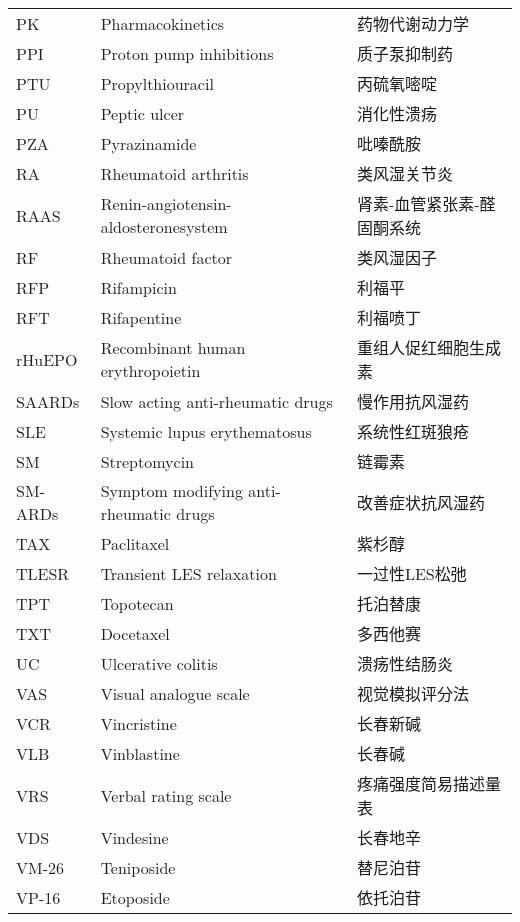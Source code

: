 \begin{longtable}[]{@{}lll@{}}
PK & Pharmacokinetics & 药物代谢动力学\tabularnewline
PPI & Proton pump inhibitions & 质子泵抑制药\tabularnewline
PTU & Propylthiouracil & 丙硫氧嘧啶\tabularnewline
PU & Peptic ulcer & 消化性溃疡\tabularnewline
PZA & Pyrazinamide & 吡嗪酰胺\tabularnewline
RA & Rheumatoid arthritis & 类风湿关节炎\tabularnewline
RAAS & Renin-angiotensin-aldosteronesystem &
肾素-血管紧张素-醛固酮系统\tabularnewline
RF & Rheumatoid factor & 类风湿因子\tabularnewline
RFP & Rifampicin & 利福平\tabularnewline
RFT & Rifapentine & 利福喷丁\tabularnewline
rHuEPO & Recombinant human erythropoietin &
重组人促红细胞生成素\tabularnewline
SAARDs & Slow acting anti-rheumatic drugs &
慢作用抗风湿药\tabularnewline
SLE & Systemic lupus erythematosus & 系统性红斑狼疮\tabularnewline
SM & Streptomycin & 链霉素\tabularnewline
SM-ARDs & Symptom modifying anti-rheumatic drugs &
改善症状抗风湿药\tabularnewline
TAX & Paclitaxel & 紫杉醇\tabularnewline
TLESR & Transient LES relaxation & 一过性LES松弛\tabularnewline
TPT & Topotecan & 托泊替康\tabularnewline
TXT & Docetaxel & 多西他赛\tabularnewline
UC & Ulcerative colitis & 溃疡性结肠炎\tabularnewline
VAS & Visual analogue scale & 视觉模拟评分法\tabularnewline
VCR & Vincristine & 长春新碱\tabularnewline
VLB & Vinblastine & 长春碱\tabularnewline
VRS & Verbal rating scale & 疼痛强度简易描述量表\tabularnewline
VDS & Vindesine & 长春地辛\tabularnewline
VM-26 & Teniposide & 替尼泊苷\tabularnewline
VP-16 & Etoposide & 依托泊苷\tabularnewline
\bottomrule
\end{longtable}

